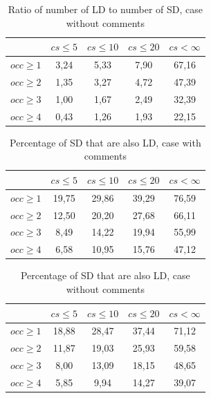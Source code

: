 \documentclass[12pt]{mitthesis}
\begin{document}
\begin{table}[!h]
\renewcommand{\arraystretch}{1}
\caption{Ratio of number of LD to number of SD, case without comments}
\label{tab:ratio:nocomm}
\centering

\begin{tabular}{|c|c|c|c|c|}
\hline
	      &	$cs\leq 5$	&	$cs\leq 10$	&	$cs\leq 20$	&	$cs< \infty$	\\
\hline
$occ\geq 1$	&	3,24	&	5,33	&	7,90	&	67,16	\\
$occ\geq 2$	&	1,35	&	3,27	&	4,72	&	47,39	\\
$occ\geq 3$	&	1,00	&	1,67	&	2,49	&	32,39	\\
$occ\geq 4$	&	0,43	&	1,26	&	1,93	&	22,15	\\
\hline
\end{tabular}
\end{table}

\begin{table}[!h]
\renewcommand{\arraystretch}{1}
\caption{Percentage of SD that are also LD, case with comments}
\label{tab:percSD:comm}
\centering

\begin{tabular}{|c|c|c|c|c|}
\hline
	      &	$cs\leq 5$	&	$cs\leq 10$	&	$cs\leq 20$	&	$cs< \infty$	\\
\hline
$occ\geq 1$	&	19,75	&	29,86	&	39,29	&	76,59	\\
$occ\geq 2$	&	12,50	&	20,20	&	27,68	&	66,11	\\
$occ\geq 3$	&	8,49	&	14,22	&	19,94	&	55,99	\\
$occ\geq 4$	&	6,58	&	10,95	&	15,76	&	47,12	\\
\hline
\end{tabular}
\end{table}

\begin{table}[!h]
\renewcommand{\arraystretch}{1}
\caption{Percentage of SD that are also LD, case without comments}
\label{tab:percSD:nocomm}
\centering

\begin{tabular}{|c|c|c|c|c|}
\hline
	      &	$cs\leq 5$	&	$cs\leq 10$	&	$cs\leq 20$	&	$cs< \infty$	\\
\hline
$occ\geq 1$	&	18,88	&	28,47	&	37,44	&	71,12	\\
$occ\geq 2$	&	11,87	&	19,03	&	25,93	&	59,58	\\
$occ\geq 3$	&	8,00	&	13,09	&	18,15	&	48,65	\\
$occ\geq 4$	&	5,85	&	9,94	&	14,27	&	39,07	\\
\hline
\end{tabular}
\end{table}
\end{document}
